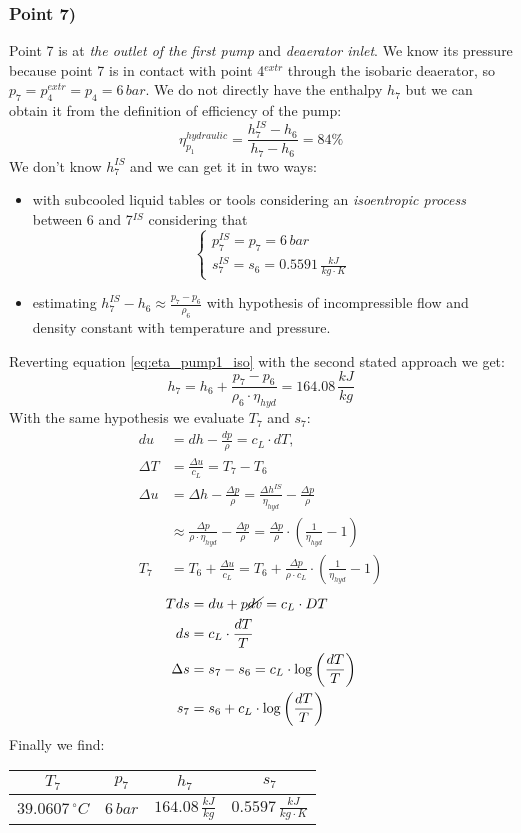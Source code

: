 \documentclass[a4paper,12pt]{article}
\newcommand{\celsius}[0]{\,^{\circ}C}
\newcommand{\kjkg}[0]{\,\frac{kJ}{kg}}
\newcommand{\kjkgk}[0]{\,\frac{kJ}{kg \cdot K}}
\newcommand{\pointdatatable}[5]{
\begin{center}
\tabulinesep=1.2mm
\begin{tabu}{|c|c|c|c|}
\hline
$ T_{#1} $ & $ p_{#1} $ & $ h_{#1} $ & $ s_{#1} $\\ \hline
$ #2 \celsius $ & $ #3 \,bar $ & $ #4 \kjkg $ & $ #5 \kjkgk $\\ \hline
\end{tabu}
\end{center}
}
\begin{document}
\subsubsection*{Point 7)}
Point 7 is at \emph{the outlet of the first pump} and \emph{deaerator inlet}. We know its pressure because point 7 is in contact with point 4$^{extr}$ through the isobaric deaerator, so $p_7=p_4^{extr}=p_4=6\, bar$. 
We do not directly have the enthalpy $h_7$ but we can obtain it from the definition of efficiency of the pump:
\begin{equation}
\label{eq:eta_pump1_iso}
\eta_{p_1}^{hydraulic} = \frac{h_7^{IS}-h_6}{h_7-h_6} = 84\%
\end{equation}
We don't know $h_7^{IS}$ and we can get it in two ways:
%
\begin{itemize}
\item with subcooled liquid tables or tools considering an \emph{isoentropic process} between 6 and 7$^{IS}$  considering that \[\begin{cases}{}
p_7^{IS} = p_7 = 6 \,bar \\ 
s_7^{IS} = s_6 = 0.5591 \kjkgk
\end{cases}\]
\item estimating $h_7^{IS}-h_6 \approx \frac{p_7-p_6}{\rho_6}$ with hypothesis of incompressible flow and density constant with temperature and pressure.
\end{itemize}
%
Reverting equation \ref{eq:eta_pump1_iso} with the second stated approach we get:
\begin{equation}
\label{eq:entalpy_point7}
h_7 = h_6 + \frac{p_7-p_6}{\rho_6 \cdot \eta_{hyd}} = 164.08 \kjkg
\end{equation}
With the same hypothesis we evaluate $T_7$ and $s_7$:
%
\begin{align}
du       &= dh-\frac{dp}{\rho} = c_L \cdot dT,\\
\Delta T &= \frac{\Delta u}{c_L} = T_7 - T_6\\
\Delta u &= \Delta h-\frac{\Delta p}{\rho} = \frac{\Delta h^{IS}}{\eta_{hyd}} - \frac{\Delta p}{\rho} \\
         &\approx \frac{\Delta p}{\rho \cdot \eta_{hyd}} - \frac{\Delta p}{\rho} 
         =\frac{\Delta p}{\rho} \cdot \left( \frac{1}{\eta_{hyd}} -1 \right) \\
T_7      &= T_6 + \frac{\Delta u}{c_L} 
= T_6 + \frac{\Delta p}{\rho \cdot c_L} \cdot \left( \frac{1}{\eta_{hyd}} -1 \right)
\label{eq:temperature_point7}
\end{align}
%
\begin{align}
Tds      &= du+p\cancel{dv} =c_L \cdot DT\\
ds       &= c_L \cdot \frac{dT}{T}\\
\Delta s &= s_7 - s_6 = c_L \cdot \log \left( \frac{dT}{T} \right)\\
s_7      &= s_6 + c_L \cdot \log \left( \frac{dT}{T} \right)
\label{eq:entropy_point7}
\end{align}
%
Finally we find:
\pointdatatable{7}{39.0607}{6}{164.08}{0.5597}
%
%
%
\end{document}
